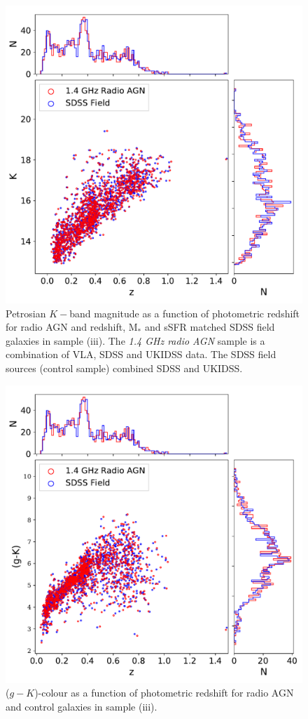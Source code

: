  \begin{figure}
  \begin{center}
    \includegraphics[width=0.8\columnwidth]{plots_chp2/K_z_super_control.pdf}
    \caption[$K-$band-redshift diagram for radio AGN and sample (iii) control galaxies]{Petrosian $K-$band magnitude as a function of photometric redshift for radio AGN and redshift, M$_*$ and sSFR matched SDSS field galaxies in sample (iii). The \textit{1.4 GHz radio AGN} sample is a combination of VLA, SDSS and UKIDSS data. The SDSS field sources (control sample) combined SDSS and UKIDSS.}
    \label{fig:K-z-supercontrol}
  \end{center}
 \end{figure}

\begin{figure}
 \begin{center}
   \includegraphics[width=0.8\columnwidth]{plots_chp2/g-K_z_super_control.pdf}
   \caption[($g-K$)-colour-redshift diagram for radio AGN and control galaxies in sample (iii)]{($g-K$)-colour as a function of photometric redshift for radio AGN and control galaxies in sample (iii).}
   \label{fig:g-K-z-supercontrol}
 \end{center}
\end{figure}

